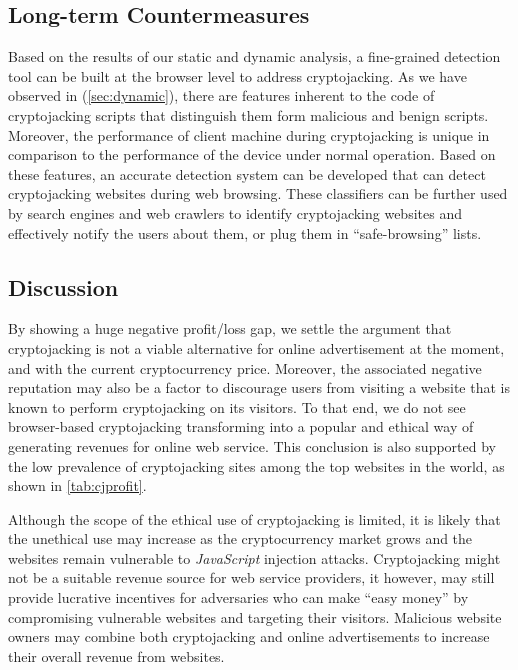 \documentclass[acmlarge]{acmart}
\newcommand{\js}{{\em JavaScript}\xspace}
\newcommand{\cc}{{cryptocurrency}\xspace}
\newcommand{\cj}{cryptojacking\xspace}
\begin{document}
\subsection{Long-term Countermeasures} \label{sec:fd}
Based on the results of our static and dynamic analysis, a fine-grained detection tool can be built at the browser level to address \cj. As we have observed in (\textsection\ref{sec:dynamic}), there are features inherent to the code of \cj scripts that distinguish them form malicious and benign scripts. Moreover, the performance of client machine during \cj is unique in comparison to the performance of the device under normal operation. Based on these features, an accurate detection system can be developed that can detect \cj websites during web browsing. These classifiers can be further used by search engines and web crawlers to identify \cj websites and effectively notify the users about them, or plug them in ``safe-browsing'' lists. %

\subsection{Discussion} \label{sec:discussion} 

By showing a huge negative profit/loss gap, we settle the argument that \cj is not a viable alternative for online advertisement at the moment, and with the current cryptocurrency price. Moreover, the associated negative reputation may also be a factor to discourage users from visiting a website that is known to perform \cj on its visitors. To that end, we do not see browser-based \cj transforming into a popular and ethical way of generating revenues for online web service. This conclusion is also supported by the low prevalence of \cj sites among the top websites in the world, as shown in \autoref{tab:cjprofit}. 

Although the scope of the ethical use of \cj is limited, it is likely that the unethical use may increase as the \cc market grows and the websites remain vulnerable to \js injection attacks. Cryptojacking might not be a suitable revenue source for web service providers, it however, may still provide lucrative incentives for adversaries who can make ``easy money'' by compromising vulnerable websites and targeting their visitors. Malicious website owners may combine both \cj and online advertisements to increase their overall revenue from websites.  
\end{document}
